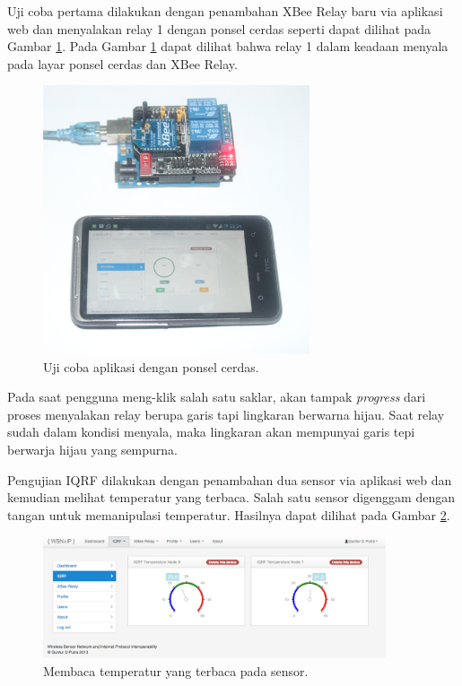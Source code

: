 			Uji coba pertama dilakukan dengan penambahan XBee Relay baru via aplikasi web dan menyalakan relay 1 dengan ponsel cerdas seperti dapat dilihat pada Gambar \ref{xbee-action}. Pada Gambar \ref{xbee-action} dapat dilihat bahwa relay 1 dalam keadaan menyala pada layar ponsel cerdas dan XBee Relay.

			\begin{figure}[H]
			  \centering
			    \includegraphics[width=0.7\textwidth]{gambar/xbee-action}
			    \caption{Uji coba aplikasi dengan ponsel cerdas.}
			    \label{xbee-action}
			\end{figure}

			Pada saat pengguna meng-klik salah satu saklar, akan tampak \emph{progress} dari proses menyalakan relay berupa garis tapi lingkaran berwarna hijau. Saat relay sudah dalam kondisi menyala, maka lingkaran akan mempunyai garis tepi berwarja hijau yang sempurna.

			Pengujian IQRF dilakukan dengan penambahan dua sensor via aplikasi web dan kemudian melihat temperatur yang terbaca. Salah satu sensor digenggam dengan tangan untuk memanipulasi temperatur. Hasilnya dapat dilihat pada Gambar \ref{screenshot-iqrf}.
			
			\begin{figure}[H]
			  \centering
			    \includegraphics[width=0.9\textwidth]{gambar/screenshot-iqrf}
			    \caption{Membaca temperatur yang terbaca pada sensor.}
			    \label{screenshot-iqrf}
			\end{figure}

